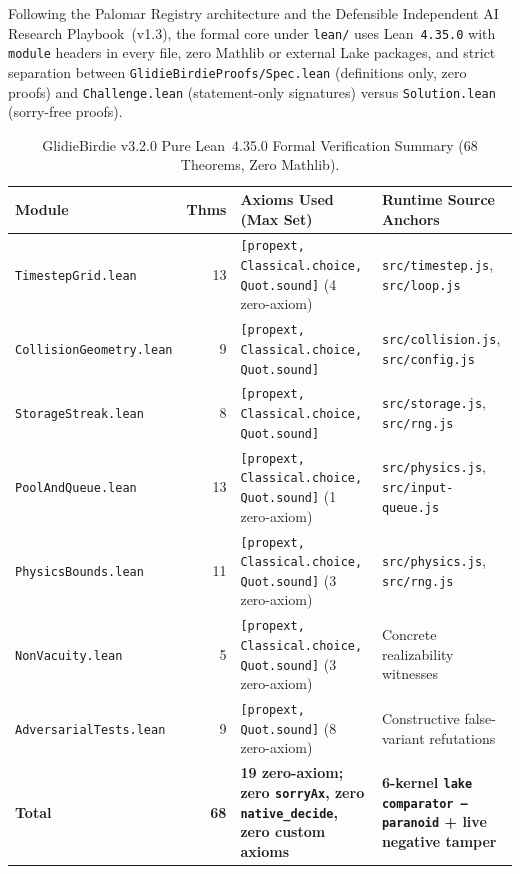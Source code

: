 \documentclass[11pt,letterpaper]{article}
\theoremstyle{remark}
\begin{document}
Following the Palomar Registry architecture \cite{palomar2026} and the Defensible Independent AI Research Playbook~(v1.3), the formal core under \texttt{lean/} uses Lean~\texttt{4.35.0} with \texttt{module} headers in every file, zero Mathlib or external Lake packages, and strict separation between \texttt{GlidieBirdieProofs/Spec.lean} (definitions only, zero proofs) and \texttt{Challenge.lean} (statement-only signatures) versus \texttt{Solution.lean} (sorry-free proofs).

\begin{table}[ht]
\centering
\caption{GlidieBirdie v3.2.0 Pure Lean~4.35.0 Formal Verification Summary (68 Theorems, Zero Mathlib).}
\label{tab:lean}
\footnotesize
\setlength{\tabcolsep}{4pt}
\begin{tabular}{@{} l r >{\raggedright\arraybackslash}p{6.0cm} >{\raggedright\arraybackslash}p{4.3cm} @{}}
\toprule
\textbf{Module} & \textbf{Thms} & \textbf{Axioms Used (Max Set)} & \textbf{Runtime Source Anchors} \\
\midrule
\texttt{TimestepGrid.lean} & 13 & \texttt{[propext, Classical.choice, Quot.sound]} (4 zero-axiom) & \texttt{src/timestep.js}, \texttt{src/loop.js} \\
\texttt{CollisionGeometry.lean} & 9 & \texttt{[propext, Classical.choice, Quot.sound]} & \texttt{src/collision.js}, \texttt{src/config.js} \\
\texttt{StorageStreak.lean} & 8 & \texttt{[propext, Classical.choice, Quot.sound]} & \texttt{src/storage.js}, \texttt{src/rng.js} \\
\texttt{PoolAndQueue.lean} & 13 & \texttt{[propext, Classical.choice, Quot.sound]} (1 zero-axiom) & \texttt{src/physics.js}, \texttt{src/input-queue.js} \\
\texttt{PhysicsBounds.lean} & 11 & \texttt{[propext, Classical.choice, Quot.sound]} (3 zero-axiom) & \texttt{src/physics.js}, \texttt{src/rng.js} \\
\texttt{NonVacuity.lean} & 5 & \texttt{[propext, Classical.choice, Quot.sound]} (3 zero-axiom) & Concrete realizability witnesses \\
\texttt{AdversarialTests.lean} & 9 & \texttt{[propext, Quot.sound]} (8 zero-axiom) & Constructive false-variant refutations \\
\midrule
\textbf{Total} & \textbf{68} & \textbf{19 zero-axiom; zero \texttt{sorryAx}, zero \texttt{native\_decide}, zero custom axioms} & \textbf{6-kernel \texttt{lake comparator --paranoid} + live negative tamper} \\
\bottomrule
\end{tabular}
\end{table}
\end{document}

